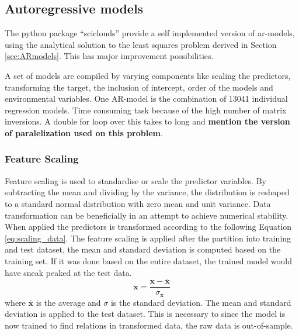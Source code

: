 \subsection{Autoregressive models}
The python package ``sciclouds'' provide a self implemented version of \acrshort{ar}-models, using the analytical solution to the least squares problem derived in Section \ref{sec:ARmodels}. This has major improvement possibilities. 

A set of models are compiled by varying components like scaling the predictors, transforming the target, the inclusion of intercept, order of the models and environmental variables. One AR-model is the combination of 13041 individual regression models. Time consuming task because of the high number of matrix inversions. A double for loop over this takes to long and \textbf{mention the version of paralelization used on this problem}.

\subsubsection{Feature Scaling} \label{sec:scaling_predictors}

Feature scaling is used to standardise or scale the predictor variables. By subtracting the mean and dividing by the variance, the distribution is reshaped to a standard normal distribution with zero mean and unit variance. Data transformation can be beneficially in an attempt to achieve numerical stability. When applied the predictors is transformed according to the following Equation \ref{eq:scaling_data}. The feature scaling is applied after the partition into training and test dataset, the mean and standard deviation is computed based on the training set. If it was done based on the entire dataset, the trained model would have sneak peaked at the test data.
\begin{equation} \label{eq:scaling_data}
    \mathbf{x} = \frac{\mathbf{x} - \bar{\mathbf{x}}}{\sigma_{\mathbf{x}}}
\end{equation}
where $\bar{\mathbf{x}}$ is the average and $\sigma$ is the standard deviation.
The mean and standard deviation is applied to the test dataset. This is necessary to since the model is now trained to find relations in transformed data, the raw data is out-of-sample.

